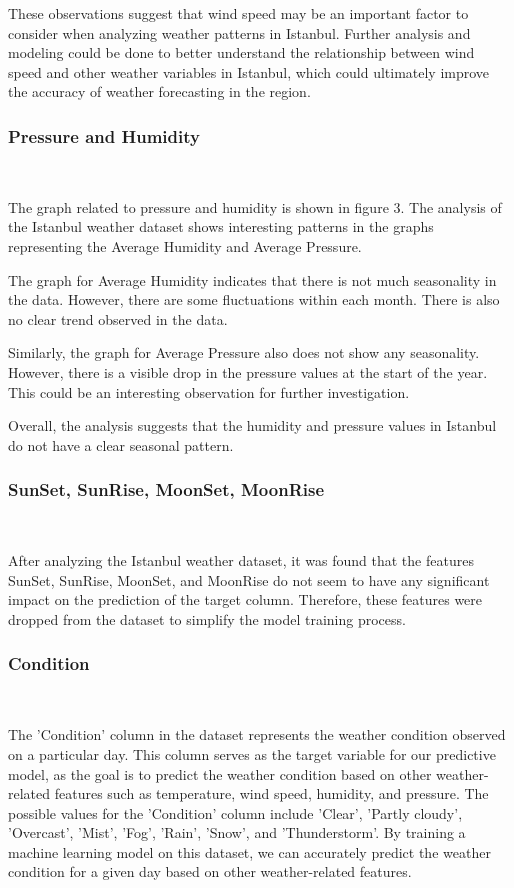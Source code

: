 \documentclass[conference,letterpaper]{IEEEtran}
\begin{document}
These observations suggest that wind speed may be an important factor to consider when analyzing weather patterns in Istanbul. Further analysis and modeling could be done to better understand the relationship between wind speed and other weather variables in Istanbul, which could ultimately improve the accuracy of weather forecasting in the region.


\subsubsection{Pressure and Humidity}
\

The graph related to pressure and humidity is shown in figure 3. The analysis of the Istanbul weather dataset shows interesting patterns in the graphs representing the Average Humidity and Average Pressure.

The graph for Average Humidity indicates that there is not much seasonality in the data. However, there are some fluctuations within each month. There is also no clear trend observed in the data.

Similarly, the graph for Average Pressure also does not show any seasonality. However, there is a visible drop in the pressure values at the start of the year. This could be an interesting observation for further investigation.

Overall, the analysis suggests that the humidity and pressure values in Istanbul do not have a clear seasonal pattern.

\subsubsection{SunSet, SunRise, MoonSet, MoonRise}
\

After analyzing the Istanbul weather dataset, it was found that the features SunSet, SunRise, MoonSet, and MoonRise do not seem to have any significant impact on the prediction of the target column. Therefore, these features were dropped from the dataset to simplify the model training process.

\subsubsection{Condition}
\

The 'Condition' column in the dataset represents the weather condition observed on a particular day. This column serves as the target variable for our predictive model, as the goal is to predict the weather condition based on other weather-related features such as temperature, wind speed, humidity, and pressure. The possible values for the 'Condition' column include 'Clear', 'Partly cloudy', 'Overcast', 'Mist', 'Fog', 'Rain', 'Snow', and 'Thunderstorm'. By training a machine learning model on this dataset, we can accurately predict the weather condition for a given day based on other weather-related features.
\end{document}
